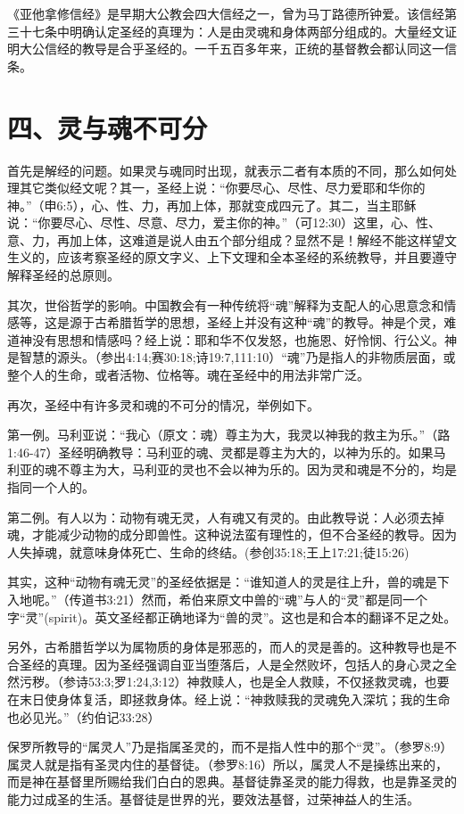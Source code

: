 《亚他拿修信经》是早期大公教会四大信经之一，曾为马丁路德所钟爱。该信经第三十七条中明确认定圣经的真理为：人是由灵魂和身体两部分组成的。大量经文证明大公信经的教导是合乎圣经的。一千五百多年来，正统的基督教会都认同这一信条。

\section{四、灵与魂不可分}
首先是解经的问题。如果灵与魂同时出现，就表示二者有本质的不同，那么如何处理其它类似经文呢？其一，圣经上说：“你要尽心、尽性、尽力爱耶和华你的神。”（申6:5），心、性、力，再加上体，那就变成四元了。其二，当主耶稣说：“你要尽心、尽性、尽意、尽力，爱主你的神。”（可12:30）这里，心、性、意、力，再加上体，这难道是说人由五个部分组成？显然不是！解经不能这样望文生义的，应该考察圣经的原文字义、上下文理和全本圣经的系统教导，并且要遵守解释圣经的总原则。

其次，世俗哲学的影响。中国教会有一种传统将“魂”解释为支配人的心思意念和情感等，这是源于古希腊哲学的思想，圣经上并没有这种“魂”的教导。神是个灵，难道神没有思想和情感吗？经上说：耶和华不仅发怒，也施恩、好怜悯、行公义。神是智慧的源头。（参出4:14;赛30:18;诗19:7,111:10）“魂”乃是指人的非物质层面，或整个人的生命，或者活物、位格等。魂在圣经中的用法非常广泛。

再次，圣经中有许多灵和魂的不可分的情况，举例如下。

第一例。马利亚说：“我心（原文：魂）尊主为大，我灵以神我的救主为乐。”（路1:46-47）圣经明确教导：马利亚的魂、灵都是尊主为大的，以神为乐的。如果马利亚的魂不尊主为大，马利亚的灵也不会以神为乐的。因为灵和魂是不分的，均是指同一个人的。

第二例。有人以为：动物有魂无灵，人有魂又有灵的。由此教导说：人必须去掉魂，才能减少动物的成分即兽性。这种说法蛮有理性的，但不合圣经的教导。因为人失掉魂，就意味身体死亡、生命的终结。(参创35:18;王上17:21;徒15:26)

其实，这种“动物有魂无灵”的圣经依据是：“谁知道人的灵是往上升，兽的魂是下入地呢。”（传道书3:21）然而，希伯来原文中兽的“魂”与人的“灵”都是同一个字“灵”(spirit)。英文圣经都正确地译为“兽的灵”。这也是和合本的翻译不足之处。

另外，古希腊哲学以为属物质的身体是邪恶的，而人的灵是善的。这种教导也是不合圣经的真理。因为圣经强调自亚当堕落后，人是全然败坏，包括人的身心灵之全然污秽。（参诗53:3;罗1:24,3:12）神救赎人，也是全人救赎，不仅拯救灵魂，也要在末日使身体复活，即拯救身体。经上说：“神救赎我的灵魂免入深坑；我的生命也必见光。”（约伯记33:28）

保罗所教导的“属灵人”乃是指属圣灵的，而不是指人性中的那个“灵”。（参罗8:9）属灵人就是指有圣灵内住的基督徒。（参罗8:16）所以，属灵人不是操练出来的，而是神在基督里所赐给我们白白的恩典。基督徒靠圣灵的能力得救，也是靠圣灵的能力过成圣的生活。基督徒是世界的光，要效法基督，过荣神益人的生活。

